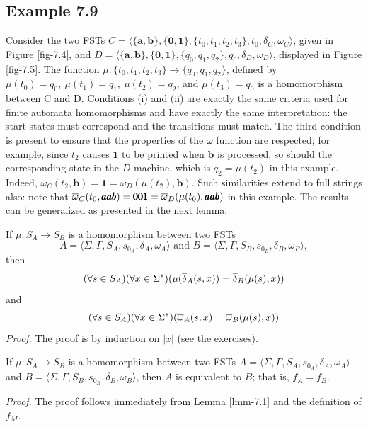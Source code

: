 \subsection*{Example 7.9}

Consider the two FSTs
$C=\langle\{\pmb{a},\pmb{b}\},\{\pmb{0},\pmb{1}\},\{t_0,t_1,t_2,t_3\},t_0,
\delta_C,\omega_C\rangle$, given in Figure \ref{fig-7.4}, and
$D=$\linebreak$\langle\{\pmb{a},\pmb{b}\},\{\pmb{0},\pmb{1}\},\{q_0,q_1,q_2\},q_0,\delta_D,
\omega_D\rangle$, displayed in Figure \ref{fig-7.5}. The function $\mu$$:\{t_0,t_1,t_2,t_3\}
\rightarrow\{q_0,q_1,q_2\}$, defined by $\mu(t_0)=q_0,\ \mu(t_1)=q_1,\
\mu(t_2)=q_2$, and $\mu(t_3)=q_0$ is a homomorphism between C and D. Conditions
(i) and (ii) are exactly the same criteria used for finite automata
homomorphisms and have exactly the same interpretation: the start states must
correspond and the transitions must match. The third condition is present to
ensure that the properties of the $\omega$ function are respected; for example,
since $t_2$ causes $\pmb{1}$ to be printed when $\pmb{b}$ is processed, so should
the corresponding state in the $D$ machine, which is $q_2=\mu(t_2)$ in this
example. Indeed, $\omega_C(t_2,\pmb{b})=\pmb{1}=\omega_D(\mu(t_2),\pmb{b})$.
Such similarities extend to full strings also: note that $\overline{\omega}_C(t_0,\pmb{aab})
=\pmb{001}=\overline{\omega}_D(\mu(t_0),\pmb{aab})$ in this example. The results can be
generalized as presented in the next lemma.

\begin{lmm}\label{lmm-7.1}
If $\mu$$: S_A \rightarrow S_B$ is a homomorphism between two FSTs
\[ A=\langle\Sigma,\Gamma,S_A,s_{0_A},\delta_A,\omega_A\rangle\text{ and }
	B=\langle\Sigma,\Gamma,S_B,s_{0_B},\delta_B,\omega_B\rangle, \]
then
\[ (\forall s \in S_A)(\forall x \in \Sigma^*)(\mu(\overline{\delta}_A(s,x)) =
	\overline{\delta}_B(\mu(s),x)) \]
and
\[ (\forall s \in S_A)(\forall x \in \Sigma^*)(\overline{\omega}_A(s,x) =
	\overline{\omega}_B(\mu(s),x)) \]
\emph{Proof.} The proof is by induction on $|x|$ (see the exercises).
\end{lmm}

\begin{cor}\label{cor-7.1}
If $\mu$$: S_A \rightarrow S_B$ is a homomorphism between two FSTs
$A=\langle\Sigma,\Gamma,S_A,s_{0_A},\delta_A,\omega_A\rangle$ and
$B=\langle\Sigma,\Gamma,S_B,s_{0_B},\delta_B,\omega_B\rangle$, then $A$ is
equivalent to $B$; that is, $f_A = f_B$.

\emph{Proof.} The proof follows immediately from Lemma \ref{lmm-7.1} and the definition of
$f_M$.
\end{cor}

